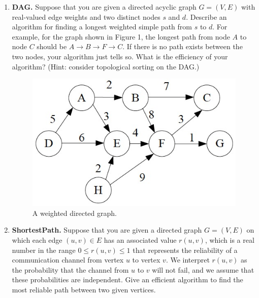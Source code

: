 \documentclass[12pt,a4paper]{article}
\makeatletter
\newtheorem*{solution}{Solution}
\theoremstyle{definition}
\renewenvironment{solution}[1][Solution] {\par\pushQED{\qed}\normalfont\topsep6\p@\@plus6\p@\relax\trivlist\item[\hskip\labelsep\bfseries#1\@addpunct{.}]\ignorespaces}{\popQED\endtrivlist\@endpefalse} \makeatother
\makeatother
\begin{document}
\begin{enumerate}

\item \textbf{DAG.} Suppose that you are given a directed acyclic graph $G=(V,E)$ with real-valued edge weights and two distinct nodes $s$ and $d$. Describe an algorithm for finding a longest weighted simple path from $s$ to $d$. For example, for the graph shown in Figure 1, the longest path from node $A$ to node $C$ should be $A \rightarrow B \rightarrow F \rightarrow C$. If there is no path exists between the two nodes, your algorithm just tells so. What is the efficiency of your algorithm? (Hint: consider topological sorting on the DAG.)


\begin{figure}[htbp]
\centering
\includegraphics[scale=0.35]{Lab08-figure1.jpg}
\caption{A weighted directed graph.}
\end{figure}

\item \textbf{ShortestPath.} Suppose that you are given a directed graph $G=(V,E)$ on which each edge $(u,v) \in E$ has an associated value $r(u,v)$, which is a real number in the range $0 \leq r(u,v) \leq 1$ that represents the reliability of a communication channel from vertex $u$ to vertex $v$. We interpret $r(u,v)$ as the probability that the channel from $u$ to $v$ will not fail, and we assume that these probabilities are independent. Give an efficient algorithm to find the most reliable path between two given vertices.


\end{enumerate}
\end{document}
